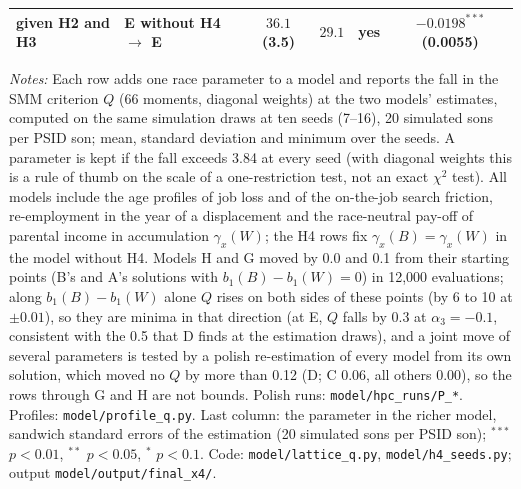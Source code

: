 \begin{table}[!htbp]
{\begin{tabular}{llcccc}
\quad given H2 and H3 & E without H4 $\to$ E & $36.1$ (3.5) & $29.1$ & yes & $-0.0198^{***}$ (0.0055) \\
\bottomrule
\end{tabular}}
\par\smallskip
\begin{minipage}{\textwidth}\footnotesize \textit{Notes:} Each row adds one race parameter to a model and reports the fall in the SMM criterion $Q$ (66 moments, diagonal weights) at the two models' estimates, computed on the same simulation draws at ten seeds (7--16), 20 simulated sons per PSID son; mean, standard deviation and minimum over the seeds. A parameter is kept if the fall exceeds 3.84 at every seed (with diagonal weights this is a rule of thumb on the scale of a one-restriction test, not an exact $\chi^2$ test). All models include the age profiles of job loss and of the on-the-job search friction, re-employment in the year of a displacement and the race-neutral pay-off of parental income in accumulation $\gamma_x(W)$; the H4 rows fix $\gamma_x(B) = \gamma_x(W)$ in the model without H4. Models H and G moved by 0.0 and 0.1 from their starting points (B's and A's solutions with $b_1(B) - b_1(W) = 0$) in 12,000 evaluations; along $b_1(B) - b_1(W)$ alone $Q$ rises on both sides of these points (by 6 to 10 at $\pm 0.01$), so they are minima in that direction (at E, $Q$ falls by 0.3 at $\alpha_3 = -0.1$, consistent with the 0.5 that D finds at the estimation draws), and a joint move of several parameters is tested by a polish re-estimation of every model from its own solution, which moved no $Q$ by more than 0.12 (D; C 0.06, all others 0.00), so the rows through G and H are not bounds. Polish runs: \texttt{model/hpc\_runs/P\_*}. Profiles: \texttt{model/profile\_q.py}. Last column: the parameter in the richer model, sandwich standard errors of the estimation (20 simulated sons per PSID son); $^{***}$ $p<0.01$, $^{**}$ $p<0.05$, $^{*}$ $p<0.1$. Code: \texttt{model/lattice\_q.py}, \texttt{model/h4\_seeds.py}; output \texttt{model/output/final\_x4/}.\end{minipage}
\end{table}
